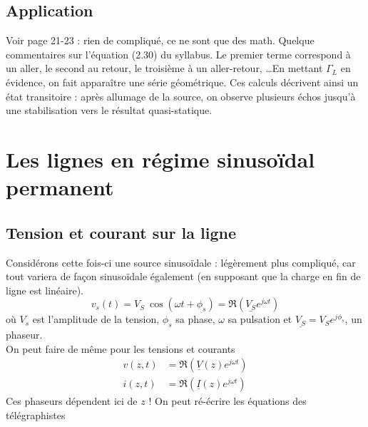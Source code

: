 	\subsection{Application}
	Voir page 21-23 : rien de compliqué, ce ne sont que des math. Quelque commentaires sur 
	l'équation (2.30) du syllabus. Le premier terme correspond à un aller, le second au 
	retour, le troisième à un aller-retour, \dots En mettant $\Gamma_L$ en évidence, on fait 
	apparaître une série géométrique. Ces calculs décrivent ainsi un état transitoire : après 
	allumage de la source, on observe plusieurs échos jusqu'à une stabilisation vers le 
	résultat quasi-statique.
	
\section{Les lignes en régime sinusoïdal permanent}
	\subsection{Tension et courant sur la ligne}
	Considérons cette fois-ci une source sinusoïdale : légèrement plus compliqué, car tout 
	variera de façon sinusoïdale également (en supposant que la charge en fin de ligne est 
	linéaire).
	\begin{equation}
	v_s(t) = V_S\ \cos(\omega t + \phi_s) = \Re\left(\underline{V_S}e^{j\omega t}\right)
	\end{equation}
	où $V_s$ est l’amplitude de la tension, $\phi_s$ sa phase, $\omega$ sa pulsation et 
	$\underline{V_S} = V_Se^{j\phi_s}$, un phaseur.\\
	On peut faire de même pour les tensions et courants
	\begin{equation}
	\begin{array}{ll}
	v(z,t) &= \Re \left(\underline{V}(z)e^{j\omega t}\right)\\
	i(z,t) &= \Re \left(\underline{I}(z)e^{j\omega t}\right)	
	\end{array}
	\end{equation}
	\danger Ces phaseurs dépendent ici de $z$ ! On peut ré-écrire les équations des 
	télégraphistes\\
	\ \\
	
